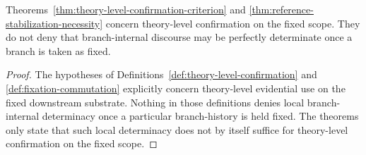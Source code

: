 \begin{proposition}
\label{prop:primary-scope-confirmation}
Theorems~\ref{thm:theory-level-confirmation-criterion} and
\ref{thm:reference-stabilization-necessity} concern theory-level confirmation on the fixed scope. They
do not deny that branch-internal discourse may be perfectly determinate once a branch is taken as
fixed.
\end{proposition}

\begin{proof}
The hypotheses of Definitions~\ref{def:theory-level-confirmation} and
\ref{def:fixation-commutation} explicitly concern theory-level evidential use on the fixed downstream
substrate. Nothing in those definitions denies local branch-internal determinacy once a particular
branch-history is held fixed. The theorems only state that such local determinacy does not by itself
suffice for theory-level confirmation on the fixed scope.
\end{proof}
